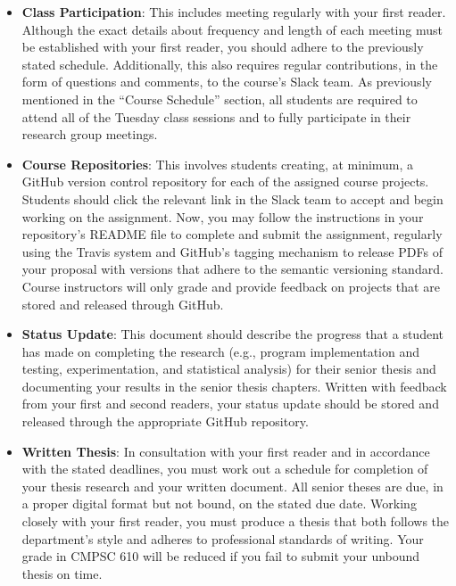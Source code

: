 \documentclass[11pt]{article}
\begin{document}
\begin{itemize}

  \item {\bf Class Participation}: This includes meeting regularly with your
    first reader. Although the exact details about frequency and length of each
    meeting must be established with your first reader, you should adhere to the
    previously stated schedule. Additionally, this also requires regular
    contributions, in the form of questions and comments, to the course's Slack
    team. As previously mentioned in the ``Course Schedule'' section, all
    students are required to attend all of the Tuesday class sessions and to
    fully participate in their research group meetings.

  \item {\bf Course Repositories}: This involves students creating, at minimum,
    a GitHub version control repository for each of the assigned course
    projects. Students should click the relevant link in the Slack team to
    accept and begin working on the assignment. Now, you may follow the
    instructions in your repository's README file to complete and submit the
    assignment, regularly using the Travis system and GitHub's tagging mechanism
    to release PDFs of your proposal with versions that adhere to the semantic
    versioning standard. Course instructors will only grade and provide feedback
    on projects that are stored and released through GitHub.

  \item {\bf Status Update}: This document should describe the progress that a
    student has made on completing the research (e.g., program implementation
    and testing, experimentation, and statistical analysis) for their senior
    thesis and documenting your results in the senior thesis chapters. Written
    with feedback from your first and second readers, your status update should
    be stored and released through the appropriate GitHub repository.

  \item {\bf Written Thesis}: In consultation with your first reader and in
    accordance with the stated deadlines, you must work out a schedule for
    completion of your thesis research and your written document. All senior
    theses are due, in a proper digital format but not bound, on the stated due
    date. Working closely with your first reader, you must produce a thesis
    that both follows the department's style and adheres to professional
    standards of writing. Your grade in CMPSC 610 will be reduced if you fail
    to submit your unbound thesis on time.


\end{itemize}
\end{document}
